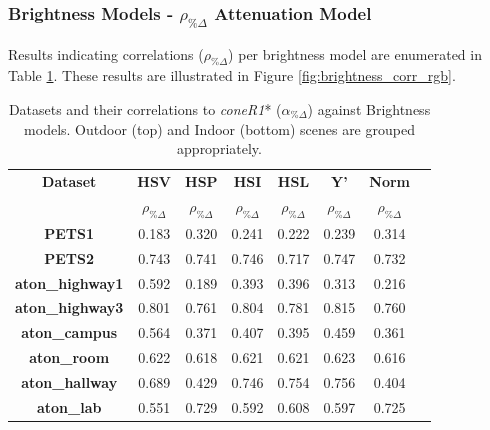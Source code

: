 \subsubsection{Brightness Models - $\rho_{\%\Delta}$ Attenuation Model}

Results indicating correlations ($\rho_{\%\Delta}$) per brightness model are enumerated in Table \ref{table:brightness_corr_rgb}. These results are illustrated in Figure \ref{fig:brightness_corr_rgb}.

\begin{table}
\centering
\begin{tabular}{ |c|c|c|c|c|c|c|c| }
	\hline
	\textbf{Dataset} & \textbf{HSV} & \textbf{HSP} & \textbf{HSI} & \textbf{HSL}& \textbf{Y'} & \textbf{Norm} \\
	\textbf{} & $\rho_{\%\Delta}$ & $\rho_{\%\Delta}$ & $\rho_{\%\Delta}$ & $\rho_{\%\Delta}$ & $\rho_{\%\Delta}$ & $\rho_{\%\Delta}$ \\
	\hline
	\hline
	\textbf{PETS1} & 0.183 & 0.320 & 0.241 & 0.222 & 0.239 & 0.314 \\
	\hline
	\textbf{PETS2} & 0.743 & 0.741 & 0.746 & 0.717 & 0.747 & 0.732 \\
	\hline
	\textbf{aton\_highway1} & 0.592 & 0.189 & 0.393 & 0.396 & 0.313 & 0.216 \\
	\hline
	\textbf{aton\_highway3} & 0.801 & 0.761 & 0.804 & 0.781 & 0.815 & 0.760 \\
	\hline
	\textbf{aton\_campus} & 0.564 & 0.371 & 0.407 & 0.395 & 0.459 & 0.361 \\
	\hline
	\hline
	\textbf{aton\_room} & 0.622 & 0.618 & 0.621 & 0.621 & 0.623 & 0.616 \\
	\hline
	\textbf{aton\_hallway} & 0.689 & 0.429 & 0.746 & 0.754 & 0.756 & 0.404 \\
	\hline
	\textbf{aton\_lab} & 0.551 & 0.729 & 0.592 & 0.608 & 0.597 & 0.725 \\
	\hline
\end{tabular}
\caption{Datasets and their correlations to \textit{coneR1}* ($\alpha_{\%\Delta}$) against Brightness models. Outdoor (top) and Indoor (bottom) scenes are grouped appropriately.}
\label{table:brightness_corr_rgb}
\end{table}

